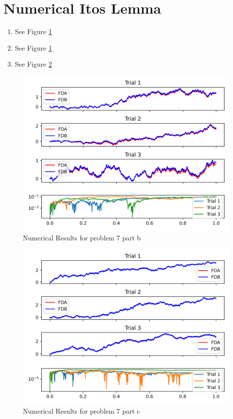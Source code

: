 \documentclass{article}
\begin{document}
\section{Numerical Itos Lemma}
    \begin{enumerate}[label=\roman*)]
        \item See Figure \ref{fig:p7pb}
        \item See Figure \ref{fig:p7pb}
        \item See Figure \ref{fig:p7pc}
    \end{enumerate}
\begin{figure}[th]
    \centering
    \includegraphics[width=\textwidth]{prob7_pb.png}
    \caption{Numerical Results for problem 7 part b}
    \label{fig:p7pb}
\end{figure}

\begin{figure}[th]
    \centering
    \includegraphics[width=\textwidth]{prob7_pc.png}
    \caption{Numerical Results for problem 7 part c}
    \label{fig:p7pc}
\end{figure}
\end{document}
